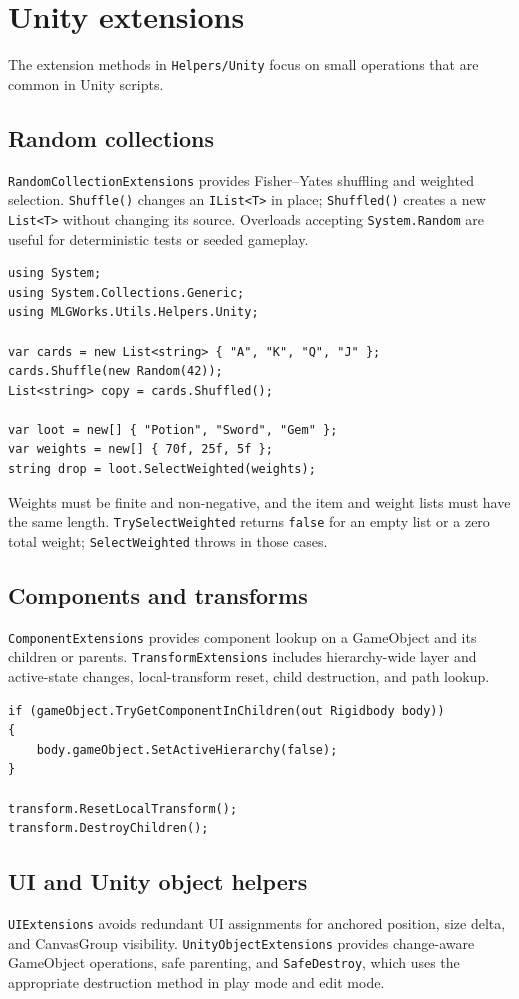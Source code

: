 \section{Unity extensions}
\label{sec:unity-extensions}

The extension methods in \texttt{Helpers/Unity} focus on small operations that are common in Unity scripts.

\subsection{Random collections}
\texttt{RandomCollectionExtensions} provides Fisher--Yates shuffling and weighted selection. \texttt{Shuffle()} changes an \texttt{IList<T>} in place; \texttt{Shuffled()} creates a new \texttt{List<T>} without changing its source. Overloads accepting \texttt{System.Random} are useful for deterministic tests or seeded gameplay.

\begin{lstlisting}
using System;
using System.Collections.Generic;
using MLGWorks.Utils.Helpers.Unity;

var cards = new List<string> { "A", "K", "Q", "J" };
cards.Shuffle(new Random(42));
List<string> copy = cards.Shuffled();

var loot = new[] { "Potion", "Sword", "Gem" };
var weights = new[] { 70f, 25f, 5f };
string drop = loot.SelectWeighted(weights);
\end{lstlisting}

Weights must be finite and non-negative, and the item and weight lists must have the same length. \texttt{TrySelectWeighted} returns \texttt{false} for an empty list or a zero total weight; \texttt{SelectWeighted} throws in those cases.

\subsection{Components and transforms}
\texttt{ComponentExtensions} provides component lookup on a GameObject and its children or parents. \texttt{TransformExtensions} includes hierarchy-wide layer and active-state changes, local-transform reset, child destruction, and path lookup.

\begin{lstlisting}
if (gameObject.TryGetComponentInChildren(out Rigidbody body))
{
    body.gameObject.SetActiveHierarchy(false);
}

transform.ResetLocalTransform();
transform.DestroyChildren();
\end{lstlisting}

\subsection{UI and Unity object helpers}
\texttt{UIExtensions} avoids redundant UI assignments for anchored position, size delta, and CanvasGroup visibility. \texttt{UnityObjectExtensions} provides change-aware GameObject operations, safe parenting, and \texttt{SafeDestroy}, which uses the appropriate destruction method in play mode and edit mode.

